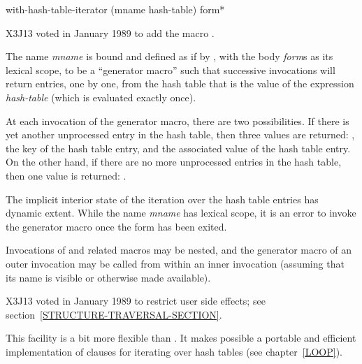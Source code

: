 \begin{defmac}
with-hash-table-iterator (mname hash-table) {form}*

X3J13 voted in January 1989
to add the macro .

The name \emph{mname} is bound and defined as if by ,
with the body \emph{form\/}s as its lexical scope, to be a ``generator macro''
such that successive invocations  will
return entries, one by one, from the hash table that is the value of the
expression \emph{hash-table} (which is evaluated exactly once).

At each invocation of the generator macro, there are two possibilities.
If there is yet another unprocessed entry in the hash table, then
three values are returned: ,
the key of the hash table entry, and
the associated value of the hash table entry.
On the other hand, if there are no more unprocessed entries in the
hash table, then one value is returned: .

The implicit interior state of the iteration over the hash table
entries has dynamic extent.  While the name \emph{mname} has
lexical scope, it is an error to invoke the generator macro
once the  form has been exited.

Invocations of 
and related macros may be nested, and the generator macro of an
outer invocation may be called from within an inner invocation
(assuming that its name is visible or otherwise made available).

\begin{new}
X3J13 voted in January 1989
to restrict user side effects; see section~\ref{STRUCTURE-TRAVERSAL-SECTION}.
\end{new}

\beforenoterule
\begin{rationale}
This facility is a bit more flexible than .
It makes possible a portable and efficient implementation of 
clauses for iterating over hash tables (see chapter~\ref{LOOP}).
\end{rationale}
\afternoterule
\end{defmac}

